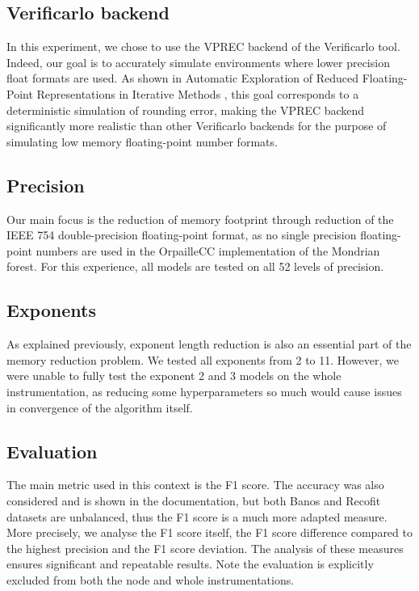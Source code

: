 \documentclass[conference]{IEEEtran}
\begin{document}
\subsection{Verificarlo backend}

In this experiment, we chose to use the VPREC backend of the Verificarlo tool.
Indeed, our goal is to accurately simulate environments where lower precision
float formats are used. As shown in Automatic Exploration of Reduced
Floating-Point Representations in Iterative Methods
\cite{chatelain2019automatic}, this goal corresponds to a deterministic
simulation of rounding error, making the VPREC backend significantly more
realistic than other Verificarlo backends for the purpose of simulating low
memory floating-point number formats.

\subsection{Precision}

Our main focus is the reduction of memory footprint through reduction of the
IEEE 754 double-precision floating-point format, as no single precision
floating-point numbers are used in the OrpailleCC implementation of the Mondrian
forest. For this experience, all models are tested on all 52 levels of
precision.

\subsection{Exponents}

As explained previously, exponent length reduction is also an essential part of
the memory reduction problem. We tested all exponents from 2 to 11. However, we
were unable to fully test the exponent 2 and 3 models on the whole
instrumentation, as reducing some hyperparameters so much would cause issues in
convergence of the algorithm itself.

\subsection{Evaluation}

The main metric used in this context is the F1 score. The accuracy was also
considered and is shown in the documentation, but both Banos and Recofit
datasets are unbalanced, thus the F1 score is a much more adapted measure. More
precisely, we analyse the F1 score itself, the F1 score difference compared to
the highest precision and the F1 score deviation. The analysis of these measures
ensures significant and repeatable results. Note the evaluation is explicitly
excluded from both the node and whole instrumentations.
\end{document}
